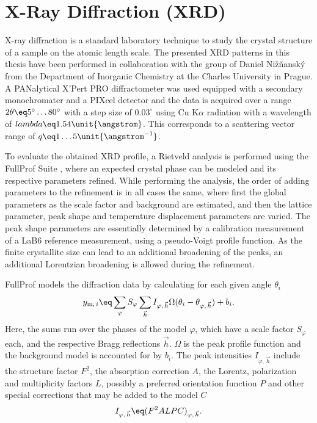 \documentclass[\main/dresen_thesis.tex]{subfiles}
\begin{document}
  \section{X-Ray Diffraction (XRD)}
    \label{ch:methods:xrd}
    X-ray diffraction is a standard laboratory technique to study the crystal structure of a sample on the atomic length scale.
    The presented XRD patterns in this thesis have been performed in collaboration with the group of Daniel Nižňanský from the Department of Inorganic Chemistry at the Charles University in Prague.
    A PANalytical X'Pert PRO diffractometer was used equipped with a secondary monochromater and a PIXcel detector and the data is acquired over a range $2 \theta \eq 5^\circ \ldots 80^\circ$ with a step size of $0.03^\circ$ using Cu K$\alpha$ radiation with a wavelength of $lambda \eq 1.54 \unit{\angstrom}$.
    This corresponds to a scattering vector range of $q \eq 1 \ldots 5 \unit{\angstrom^{-1}}$.

    To evaluate the obtained XRD profile, a Rietveld analysis is performed using the FullProf Suite \cite{Rodriguez_1993_Recen}, where an expected crystal phase can be modeled and its respective parameters refined.
    While performing the analysis, the order of adding parameters to the refinement is in all cases the same, where first the global parameters as the scale factor and background are estimated, and then the lattice parameter, peak shape and temperature displacement parameters are varied.
    The peak shape parameters are essentially determined by a calibration measurement of a LaB6 reference measurement, using a pseudo-Voigt profile function.
    As the finite crystallite size can lead to an additional broadening of the peaks, an additional Lorentzian broadening is allowed during the refinement.

    FullProf models the diffraction data by calculating for each given angle $\theta_i$
    \begin{align}
      y_{\mathrm{m}, \, i} \eq
        \sum_{\varphi} S_{\varphi}
        \sum_{\vec{h}}
          I_{\varphi, \, \vec{h}}
          \Omega ( \theta_{i} - \theta_{\varphi, \, \vec{h}})
        + b_i.
    \end{align}
    Here, the sums run over the phases of the model $\varphi$, which have a scale factor $S_{\varphi}$ each, and the respective Bragg reflections $\vec{h}$.
    $\Omega$ is the peak profile function and the background model is accounted for by $b_i$.
    The peak intensities $I_{\varphi, \, \vec{h}}$ include the structure factor $F^2$, the absorption correction $A$, the Lorentz, polarization and multiplicity factors $L$, possibly a preferred orientation function $P$ and other special corrections that may be added to the model $C$
    \begin{align}
      I_{\varphi, \, \vec{h}} \eq (F^2 A L P C)_{\varphi, \, \vec{h}}.
    \end{align}
\end{document}
